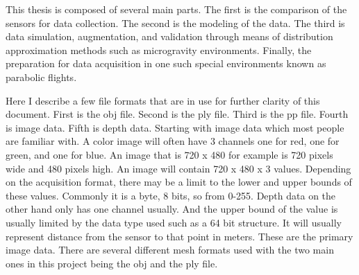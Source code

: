 This thesis is composed of several main parts. The first is the comparison of the sensors for data collection. The second is the modeling of the data. The third is data simulation, augmentation, and validation through means of distribution approximation methods such as microgravity environments. Finally, the preparation for data acquisition in one such special environments known as parabolic flights.

Here I describe a few file formats that are in use for further clarity of this document. First is the obj file. Second is the ply file. Third is the pp file. Fourth is image data. Fifth is depth data. Starting with image data which most people are familiar with. A color image will often have 3 channels one for red, one for green, and one for blue. An image that is 720 x 480 for example is 720 pixels wide and 480 pixels high. An image will contain 720 x 480 x 3 values. Depending on the acquisition format, there may be a limit to the lower and upper bounds of these values. Commonly it is a byte, 8 bits, so from 0-255. Depth data on the other hand only has one channel usually. And the upper bound of the value is usually limited by the data type used such as a 64 bit structure. It will usually represent distance from the sensor to that point in meters. These are the primary image data. There are several different mesh formats used with the two main ones in this project being the obj and the ply file.


